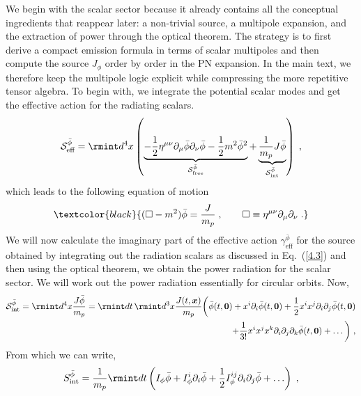 We begin with the scalar sector because it already contains all the conceptual ingredients that reappear later: a non-trivial source, a multipole expansion, and the extraction of power through the optical theorem. The strategy is to first derive a compact emission formula in terms of scalar multipoles and then compute the source $J_\phi$ order by order in the PN expansion. In the main text, we therefore keep the multipole logic explicit while compressing the more repetitive tensor algebra. To begin with, we integrate the potential scalar modes and get the effective action for the radiating scalars.  
\begin{equation}
\mathcal{S}_{\text{eff}}^{\Bar{\phi}}=  \rmint d^4x  \left(\underbrace{ -\frac{1}{2} \eta^{\mu \nu}  \partial_\mu \bar{\phi} \partial_\nu \bar{\phi} 
-\frac{1}{2}m^2\bar{\phi}^2 }_{\mathcal{S}_{\rm free}^{\bar\phi}} + \underbrace{\frac{1}{m_p} J   \bar{\phi}}_{\mathcal{S}_{\text{int}}^{\bar\phi}} \right)\;, 
\end{equation}
which leads to the following equation of motion 
\begin{equation}
\textcolor{black}{(\square-m^2 )\bar{\phi} = \frac{J}{m_p} \;, \qquad \square \equiv \eta^{\mu \nu}  \partial_\mu  \partial_\nu \;.}
\end{equation}
We will now calculate the imaginary part of the effective action $\gamma_{\text{eff}}^{\bar\phi}$ for the source obtained by integrating out the radiation scalars as discussed in Eq.~(\ref{4.3}) 
and then using the optical theorem, we obtain the power radiation for the scalar sector. We will work out the power radiation essentially for circular orbits. Now,
\begin{equation}
\begin{split}
\mathcal{S}_{\rm int}^{\bar\phi} = \rmint d^4 x \frac{J \bar \phi }{m_p}= \rmint dt \, \rmint d^3 x \frac{J (t, \boldsymbol{x})}{m_p}  \bigg( \bar{\phi}(t, \boldsymbol{0}) + x^i \partial_i \bar{\phi}(t,\boldsymbol{0}) + \frac{1}{2} x^i x^j \partial_i \partial_j \bar{\phi}(t, \boldsymbol{0})  \\
+ \frac{1}{3!} x^i x^j x^k \partial_i \partial_j \partial_k \bar{\phi}(t, \boldsymbol{0}) + \ldots \bigg) \;,
\label{5.10}
\end{split}
\end{equation}
From which we can write,
\begin{align}
\begin{split}
S_{\rm int}^{\bar\phi} = \frac{1}{m_p} \rmint dt \left( I_\phi \bar{\phi} + I_\phi^i \partial_i \bar{\phi} + \frac{1}{2} I_\phi^{ij} \partial_i \partial_j \bar{\phi}  + \ldots \right) \;,
\end{split}
\label{eq:multipole_expansion_scalar}
\end{align}
